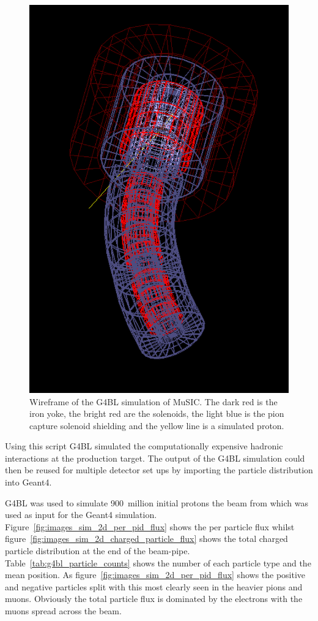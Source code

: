 \begin{figure}[hptb]
  \centering
    \includegraphics[width=.75\textwidth]{images/Geometry/g4bl_wireframe.png}
  \caption{Wireframe of the G4BL simulation of MuSIC. The dark red is the iron yoke, the bright red are the solenoids, the light blue is the pion capture solenoid shielding and the yellow line is a simulated proton.}
  \label{fig:images_Geometry_g4bl_wireframe}
\end{figure}

Using this script G4BL simulated the computationally expensive hadronic interactions at the production target. The output of the G4BL simulation could then be reused for multiple detector set ups by importing the particle distribution into Geant4.

G4BL was used to simulate 900~million initial protons the beam from which was used as input for the Geant4 simulation. Figure~\ref{fig:images_sim_2d_per_pid_flux} shows the per particle flux whilst figure~\ref{fig:images_sim_2d_charged_particle_flux} shows the total charged particle distribution at the end of the beam-pipe. Table~\ref{tab:g4bl_particle_counts} shows the number of each particle type and the mean position. As figure~\ref{fig:images_sim_2d_per_pid_flux} shows the positive and negative particles split with this most clearly seen in the heavier pions and muons. Obviously the total particle flux is dominated by the electrons with the muons spread across the beam.


